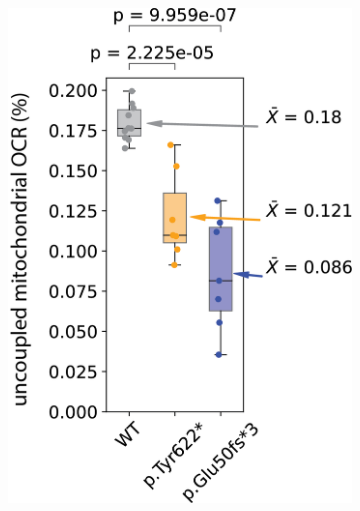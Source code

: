 \begin{figure}[ht]
\begin{subfigure}[t]{0.25\textwidth}
    \end{subfigure} 
    \hspace{0.1\textwidth}
    \begin{subfigure}[t]{0.25\textwidth}
        \caption{}
        \includegraphics[width=\textwidth]{./extended_plots/uncoupling_quantification_batch1.png}        
    \end{subfigure} 
    \hspace{0.1\textwidth}
    \begin{subfigure}[t]{0.25\textwidth}
        \caption{}

\end{subfigure}
\end{figure}
